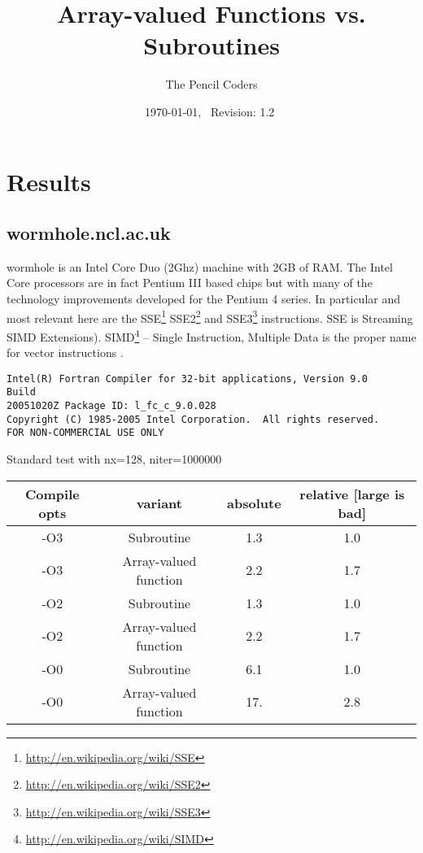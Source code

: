 \documentclass[a4paper,twoside,12pt]{article}
\newcommand{\fnurl}[1]{\footnote{\url{#1}}}
\begin{document}
\title{Array-valued Functions vs. Subroutines} %
\author{The Pencil Coders}          %
\date{\today,~ $ $Revision: 1.2 $ $}            %

\maketitle
\label{firstpage}


\chapter{Results} 
\section{wormhole.ncl.ac.uk}
wormhole is an Intel Core Duo (2Ghz) machine with 2GB of RAM.  The Intel
Core processors are in fact Pentium III based chips but with many of the
technology improvements developed for the Pentium 4 series.  In particular
and most relevant here are the
SSE\fnurl{http://en.wikipedia.org/wiki/SSE}
SSE2\fnurl{http://en.wikipedia.org/wiki/SSE2} and
SSE3\fnurl{http://en.wikipedia.org/wiki/SSE3} instructions.  SSE is Streaming
SIMD Extensions). SIMD\fnurl{http://en.wikipedia.org/wiki/SIMD} -- Single Instruction, Multiple Data is the proper
name for vector instructions .
\begin{verbatim}
Intel(R) Fortran Compiler for 32-bit applications, Version 9.0    Build
20051020Z Package ID: l_fc_c_9.0.028
Copyright (C) 1985-2005 Intel Corporation.  All rights reserved.
FOR NON-COMMERCIAL USE ONLY
\end{verbatim}

Standard test with nx=128, niter=1000000

\begin{tabular}{cccc}
   Compile opts     &       variant       &     absolute & relative [large is bad] \\
\hline
   -O3     &  Subroutine            &    1.3    &   1.0 \\
   -O3     &  Array-valued function &    2.2    &   1.7 \\
\hline
   -O2     &  Subroutine            &    1.3    &   1.0 \\
   -O2     &  Array-valued function &    2.2    &   1.7 \\
\hline
   -O0     &  Subroutine            &    6.1    &   1.0 \\
   -O0     &  Array-valued function &    17.    &   2.8 \\
\hline
\end{tabular}
\end{document}
